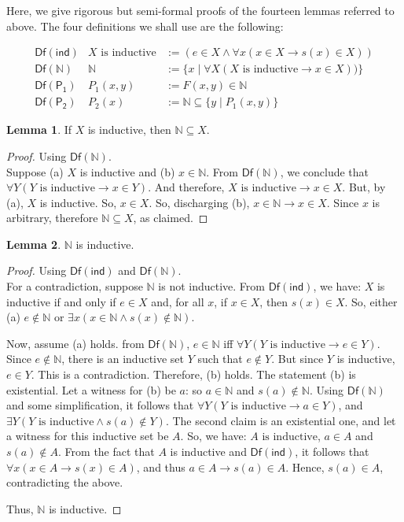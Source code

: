 \documentclass[11pt,a4paper]{article}
\newcommand{\N}{ \ensuremath{ \mathbb{N}}}
\newcommand{\beqn}{\begin{eqnarray*}}
\newcommand{\eeqn}{\end{eqnarray*}}
\theoremstyle{definition}
\newtheorem{lem}{Lemma}
\begin{document}
Here, we give rigorous but semi-formal proofs of the fourteen lemmas referred to above. The four definitions we shall use are the following:

\beqn
\mathsf{Df(ind)} & X \text{ is inductive} &:= (e \in X \wedge \forall x (x \in X \to s(x) \in X))\\
\mathsf{Df(\N)} & \N &:= \{x \mid \forall X (X \text{ is inductive} \to x \in X))\} \\
\mathsf{Df(P_1)} & P_1(x, y) &:= F(x,y) \in \N \\
\mathsf{Df(P_2)} & P_2(x) &:= \N \subseteq \{y \mid P_1(x, y)\}
\eeqn


\begin{lem}\label{lem1} If $X$ is inductive, then $\N \subseteq X$.\end{lem}
\begin{proof} Using $\mathsf{Df(\N)}$.\\
Suppose (a) $X$ is inductive and (b) $x \in \N$. From $\mathsf{Df(\N)}$, we conclude that $\forall Y (Y \text{ is inductive} \to x \in Y)$. And therefore, $X \text{ is inductive} \to x \in X$. But, by (a), $X$ is inductive. So, $x \in X$. So, discharging (b), $x \in \N \to x \in X$. Since $x$ is arbitrary, therefore $\N \subseteq X$, as claimed.
\end{proof}

\begin{lem}\label{lem2} $\N$ is inductive.\end{lem}
\begin{proof} Using $\mathsf{Df(ind)}$ and $\mathsf{Df(\N)}$.\\
For a contradiction, suppose $\N$ is not inductive. From $\mathsf{Df(ind)}$, we have: $X$ is inductive if and only if $e \in X$ and, for all $x$, if $x \in X$, then $s(x) \in X$. So, either (a) $e \notin \N$ or $\exists x (x \in \N \wedge s(x) \notin \N)$. 

Now, assume (a) holds. from $\mathsf{Df(\N)}$, $e \in \N$ iff $\forall Y (Y \text{ is inductive} \to e \in Y)$. Since $e \notin \N$, there is an inductive set $Y$ such that $e \notin Y$. But since $Y$ is inductive, $e \in Y$. This is a contradiction. Therefore, (b) holds. The statement (b) is existential. Let a witness for (b) be $a$: so $a \in \N$ and $s(a) \notin \N$. Using $\mathsf{Df(\N)}$ and some simplification, it follows that $\forall Y (Y \text{ is inductive} \to a \in Y)$, and $\exists Y (Y \text{ is inductive} \wedge s(a) \notin Y)$. The second claim is an existential one, and let a witness for this inductive set be $A$. So, we have: $A \text{ is inductive}$, $a \in A$ and $s(a) \notin A$. From the fact that $A$ is inductive and $\mathsf{Df(ind)}$, it follows that $\forall x (x \in A \to s(x) \in A)$, and thus $a \in A \to s(a) \in A$. Hence, $s(a) \in A$, contradicting the above.

Thus, $\N$ is inductive.
\end{proof}
\end{document}
